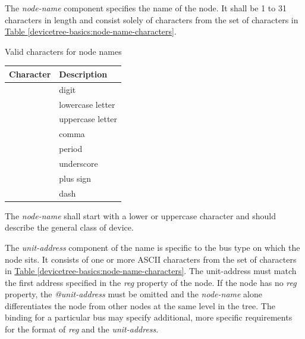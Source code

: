 \documentclass[a4paper,10pt,oneside]{sphinxmanual}
\begin{document}
The \emph{node-name} component specifies the name of the node. It shall be 1
to 31 characters in length and consist solely of characters from the set
of characters in \hyperref[devicetree-basics:node-name-characters]{Table \ref{devicetree-basics:node-name-characters}}.


\begin{threeparttable}
\capstart\caption{Valid characters for node names}\label{devicetree-basics:node-name-characters}\label{devicetree-basics:id4}
\begin{tabulary}{\linewidth}{c p{8cm}}
\hline
\textsf{\relax 
Character
} & \textsf{\relax 
Description
}\\
\hline
{}
 & 
digit
\\
\hline
{}
 & 
lowercase letter
\\
\hline
{}
 & 
uppercase letter
\\
\hline
\code{,}
 & 
comma
\\
\hline
{}
 & 
period
\\
\hline
\code{\_}
 & 
underscore
\\
\hline
\code{+}
 & 
plus sign
\\
\hline
\code{-}
 & 
dash
\\
\hline\end{tabulary}

\end{threeparttable}


The \emph{node-name} shall start with a lower or uppercase character and
should describe the general class of device.

The \emph{unit-address} component of the name is specific to the bus type on
which the node sits. It consists of one or more ASCII characters from
the set of characters in \hyperref[devicetree-basics:node-name-characters]{Table \ref{devicetree-basics:node-name-characters}}. The
unit-address must match the first
address specified in the \emph{reg} property of the node. If the node has no
\emph{reg} property, the \emph{@unit-address} must be omitted and the
\emph{node-name} alone differentiates the node from other nodes at the same
level in the tree. The binding for a particular bus may specify
additional, more specific requirements for the format of \emph{reg} and the
\emph{unit-address}.
\end{document}
